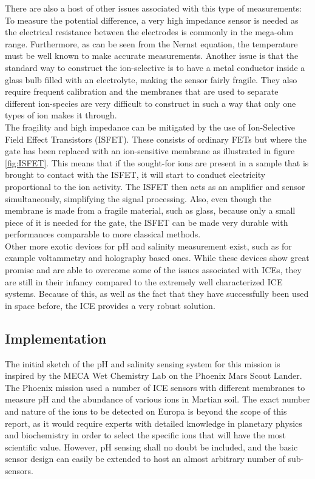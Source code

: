\noindent
There are also a host of other issues associated with this type of measurements: To measure the potential difference, a very high impedance sensor is needed as the electrical resistance between the electrodes is commonly in the mega-ohm range\cite{website:ph3}. Furthermore, as can be seen from the Nernst equation, the temperature must be well known to make accurate measurements. Another issue is that the standard way to construct the ion-selective is to have a metal conductor inside a glass bulb filled with an electrolyte, making the sensor fairly fragile. They also require frequent calibration and the membranes that are used to separate different ion-species are very difficult to construct in such a way that only one types of ion makes it through\cite{website:ph1}.\\

\noindent
The fragility and high impedance can be mitigated by the use of Ion-Selective Field Effect Transistors (ISFET). These consists of ordinary FETs but where the gate has been replaced with an ion-sensitive membrane as illustrated in figure \ref{fig:ISFET}. This means that if the sought-for ions are present in a sample that is brought to contact with the ISFET, it will start to conduct electricity proportional to the ion activity. The ISFET then acts as an amplifier and sensor simultaneously, simplifying the signal processing\cite{website:ph4}. Also, even though the membrane is made from a fragile material, such as glass, because only a small piece of it is needed for the gate, the ISFET can be made very durable with performances comparable to more classical methods\cite{website:ph4}. \\ 

\noindent
Other more exotic devices for pH and salinity measurement exist, such as for example voltammetry\cite{website:senova} and holography\cite{article:marshall2003a} based ones. While these devices show great promise and are able to overcome some of the issues associated with ICEs, they are still in their infancy compared to the extremely well characterized ICE systems. Because of this, as well as the fact that they have successfully been used in space before\cite{article:jgre2487}, the ICE provides a very robust solution.

\subsection{Implementation}
The initial sketch of the pH and salinity sensing system for this mission is inspired by the MECA Wet Chemistry Lab on the Phoenix Mars Scout Lander. The Phoenix mission used a number of ICE sensors with different membranes to measure pH and the abundance of various ions in Martian soil\cite{article:jgre2487}. The exact number and nature of the ions to be detected on Europa is beyond the scope of this report, as it would require experts with detailed knowledge in planetary physics and biochemistry in order to select the specific ions that will have the most scientific value. However, pH sensing shall no doubt be included, and the basic sensor design can easily be extended to host an almost arbitrary number of sub-sensors.\\

